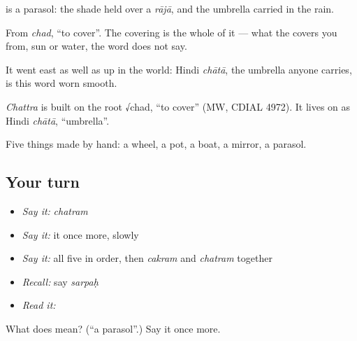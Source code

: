 \textbf{} is a parasol: the shade held over a \emph{rājā}, and the umbrella carried in the rain.

From \emph{chad}, \textquotedblleft{}to cover\textquotedblright{}. The covering is the whole of it — what the \textbf{} covers you from, sun or water, the word does not say.

It went east as well as up in the world: Hindi \emph{chātā}, the umbrella anyone carries, is this word worn smooth.

\begin{cousinweb}
\emph{Chattra} is built on the root √chad, \textquotedblleft{}to cover\textquotedblright{} (MW, CDIAL 4972). It lives on as Hindi \emph{chātā}, \textquotedblleft{}umbrella\textquotedblright{}.
\end{cousinweb}

\begin{grammarlens}[title={What you've built}]
Five things made by hand: a wheel, a pot, a boat, a mirror, a parasol.
\end{grammarlens}

\subsection*{Your turn}
\begin{itemize}
\raggedright
  \item \emph{Say it:} \emph{chatram}
  \item \emph{Say it:} it once more, slowly
  \item \emph{Say it:} all five in order, then \emph{cakram} and \emph{chatram} together
  \item \emph{Recall:} say \emph{sarpaḥ}
  \item \emph{Read it:} \textbf{}
\end{itemize}

\begin{tcolorbox}[breakable,colback=teal!4,colframe=teal!35!black,title={Before you move on}]
What does  mean? (\textquotedblleft{}a parasol\textquotedblright{}.) Say it once more.
\end{tcolorbox}
